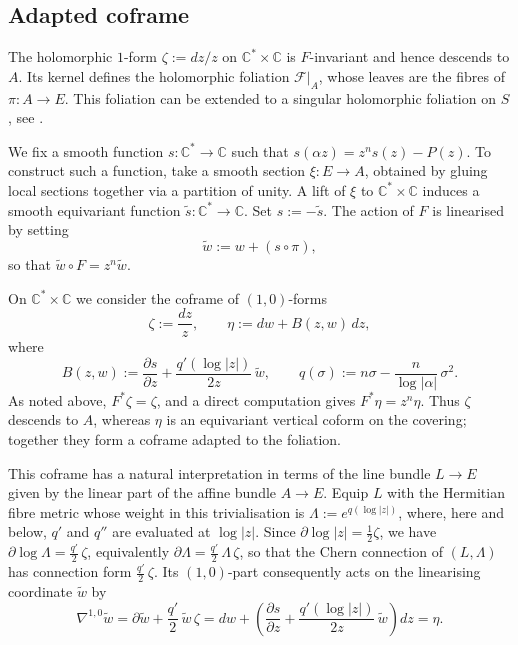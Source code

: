 \documentclass[12pt]{amsart}
\numberwithin{equation}{section}
\theoremstyle{remark}
\theoremstyle{definition}
\begin{document}
\subsection{Adapted coframe}

The holomorphic $1$-form $\zeta:=dz/z$ on $\mathbb C^*\times\mathbb C$ is $F$-invariant and hence descends to $A$. Its kernel defines the holomorphic foliation $\mathcal F\vert_A$, whose leaves are the fibres of $\pi\colon A \to E$. This foliation can be extended to a singular holomorphic foliation on $S$, see \cite{DO}.

We fix a smooth function $s\colon \mathbb C^*\to\mathbb C$ such that $s(\alpha z)=z^ns(z)-P(z)$.
To construct such a function, take a smooth section $\xi \colon E \to A$, obtained by gluing local sections together via a partition of unity. A lift of $\xi$ to $\mathbb C^*\times\mathbb C$ induces a smooth equivariant function $\tilde s\colon \mathbb C^* \to \mathbb C$. Set $s:=-\tilde s$.
The action of $F$ is linearised by setting
\begin{equation}\label{eq:tilde-w}
\tilde w:=w+(s\circ\pi),
\end{equation}
so that $\tilde w \circ F = z^n\tilde w$.

On $\mathbb{C}^{*}\times\mathbb{C}$ we consider the coframe of $(1,0)$-forms
$$ \zeta:=\frac{dz}{z}, \qquad \eta:=dw+B(z,w)\,dz, $$
where
$$ B(z,w):=\frac{\partial s}{\partial z}+\frac{q'(\log|z|)}{2z}\,\tilde{w}, \qquad
q(\sigma):=n\sigma-\frac{n}{\log|\alpha|}\,\sigma^{2}. $$
As noted above, $F^{*}\zeta=\zeta$, and a direct computation gives $F^{*}\eta=z^{n}\eta$. Thus $\zeta$ descends to $A$, whereas $\eta$ is an equivariant vertical coform on the covering; together they form a coframe adapted to the foliation.

This coframe has a natural interpretation in terms of the line bundle $L\to E$ given by the linear part of the affine bundle $A\to E$. Equip $L$ with the Hermitian fibre metric whose weight in this trivialisation is $\Lambda:=e^{q(\log|z|)}$, where, here and below, $q'$ and $q''$ are evaluated at $\log|z|$. Since $\partial\log|z|=\tfrac12\zeta$, we have $\partial\log\Lambda=\tfrac{q'}{2}\,\zeta$, equivalently $\partial\Lambda=\tfrac{q'}{2}\,\Lambda\,\zeta$, so that the Chern connection of $(L,\Lambda)$ has connection form $\tfrac{q'}{2}\,\zeta$. Its $(1,0)$-part consequently acts on the linearising
coordinate $\tilde w$ by
$$ \nabla^{1,0}\tilde{w} = \partial\tilde{w}+\frac{q'}{2}\,\tilde{w}\,\zeta = dw+\left(\frac{\partial s}{\partial z}+\frac{q'(\log|z|)}{2z}\,\tilde{w}\right)dz = \eta. $$
\end{document}
